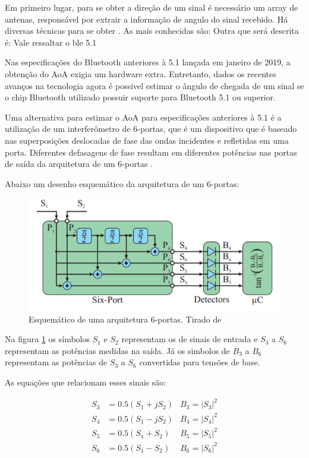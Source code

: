 Em primeiro lugar, para se obter a direção de um sinal é necessário um array de antenas, responsável por extrair a informação de angulo do sinal recebido. Há diversas técnicas para se obter . As mais conhecidas são: Outra que será descrita é:
Vale ressaltar o ble 5.1

Nas especificações do Bluetooth anteriores à 5.1 lançada em janeiro de 2019, a obtenção do AoA exigia um hardware extra.
Entretanto, dados os recentes avanços na tecnologia agora é possivel estimar o ângulo de chegada de um sinal se o chip Bluetooth utilizado possuir suporte para Bluetooth 5.1 ou superior.

Uma alternativa para estimar o AoA para especificações anteriores à 5.1 é a utilização de um interferômetro de 6-portas, que é um dispositivo que é baseado nas superposições deslocadas de fase das ondas incidentes e refletidas em uma porta. Diferentes defasagens de fase resultam em diferentes potências nas portas de saída da arquitetura de um 6-portas \cite{art14}.

Abaixo um desenho esquemático da arquitetura de um 6-portas: 

\begin{figure}[H]
	\centering 
	\includegraphics[scale = 1]{images/six_port_schematic.png}
	\caption{Esquemático de uma arquitetura 6-portas. Tirado de \cite{art15} }
	\label{fig:six_port_schematic}
\end{figure}

Na figura \ref{fig:six_port_schematic} os símbolos \( S_1 \) e \( S_2 \) representam os de sinais de entrada e \( S_3 \) a \( S_6 \) representam as potências medidas na saída. Já os simbolos de \( B_3 \) a \( B_6 \) representam as potências de \( S_3 \) a \( S_6 \) convertidas para tensões de base.

As equações que relacionam esses sinais são:

\begin{align*}
    S_3 & = 0.5(S_1 + jS_2) & B_3 = \left | S_3 \right | ^2\\
    S_4 & = 0.5(S_1 - jS_2) & B_4 = \left | S_4 \right | ^2\\
    S_5 & = 0.5(S_1 + S_2)  & B_5 = \left | S_5 \right | ^2\\
    S_6 & = 0.5(S_1 - S_2)  & B_6 = \left | S_6 \right | ^2
\end{align*}

